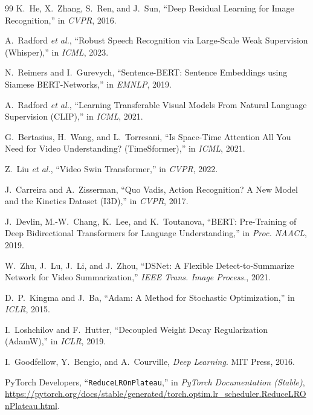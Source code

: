 \documentclass[10pt,conference]{IEEEtran}
\begin{document}
\begin{thebibliography}{99}
K.~He, X.~Zhang, S.~Ren, and J.~Sun,
``Deep Residual Learning for Image Recognition,''
in \textit{CVPR}, 2016.

A.~Radford \textit{et al.},
``Robust Speech Recognition via Large-Scale Weak Supervision (Whisper),''
in \textit{ICML}, 2023.

N.~Reimers and I.~Gurevych,
``Sentence-BERT: Sentence Embeddings using Siamese BERT-Networks,''
in \textit{EMNLP}, 2019.

A.~Radford \textit{et al.},
``Learning Transferable Visual Models From Natural Language Supervision (CLIP),''
in \textit{ICML}, 2021.

G.~Bertasius, H.~Wang, and L.~Torresani,
``Is Space-Time Attention All You Need for Video Understanding? (TimeSformer),''
in \textit{ICML}, 2021.

Z.~Liu \textit{et al.},
``Video Swin Transformer,''
in \textit{CVPR}, 2022.

J.~Carreira and A.~Zisserman,
``Quo Vadis, Action Recognition? A New Model and the Kinetics Dataset (I3D),''
in \textit{CVPR}, 2017.

J.~Devlin, M.-W.~Chang, K.~Lee, and K.~Toutanova,
``BERT: Pre-Training of Deep Bidirectional Transformers for Language
Understanding,''
in \textit{Proc. NAACL}, 2019.


W.~Zhu, J.~Lu, J.~Li, and J.~Zhou,
``DSNet: A Flexible Detect-to-Summarize Network for Video Summarization,''
\textit{IEEE Trans. Image Process.}, 2021.


D.~P.~Kingma and J.~Ba,
``Adam: A Method for Stochastic Optimization,''
in \textit{ICLR}, 2015.

I.~Loshchilov and F.~Hutter,
``Decoupled Weight Decay Regularization (AdamW),''
in \textit{ICLR}, 2019.

I.~Goodfellow, Y.~Bengio, and A.~Courville,
\textit{Deep Learning}.
MIT Press, 2016.

PyTorch Developers,
``\texttt{ReduceLROnPlateau},'' in \textit{PyTorch Documentation (Stable)},
\url{https://pytorch.org/docs/stable/generated/torch.optim.lr_scheduler.ReduceLROnPlateau.html}.


\end{thebibliography}
\end{document}
